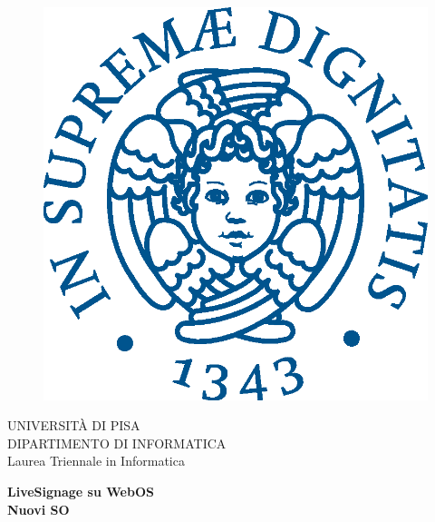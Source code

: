 \begin{titlepage}
\begin{figure}[!htb]
    \centering
    \includegraphics[keepaspectratio=true,scale=0.5]{images/Frontespizio/cherubinFrontespizio.eps}
\end{figure}

\begin{center}
    \LARGE{UNIVERSITÀ DI PISA}
    \vspace{5mm}
    \\ \large{DIPARTIMENTO DI INFORMATICA}
    \vspace{5mm}
    \\ \LARGE{Laurea Triennale in Informatica}
\end{center}

\vspace{15mm}
\begin{center}
    {\LARGE{\bf LiveSignage su WebOS\\ \vspace{5mm} Nuovi SO }}
    
    
\end{center}
\vspace{30mm}


\end{titlepage}
